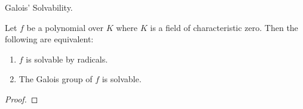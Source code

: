 \documentclass[../book.tex]{subfiles}
\begin{document}
\begin{thm} Galois' Solvability.
    
    Let $f$ be a polynomial over $K$ where $K$ is a field of characteristic zero.
    Then the following are equivalent: \begin{enumerate}
        \item $f$ is solvable by radicals.
        \item The Galois group of $f$ is solvable.
    \end{enumerate}
    
\end{thm}
\begin{proof}
    
    
    
    
    
    

\end{proof}
\end{document}
